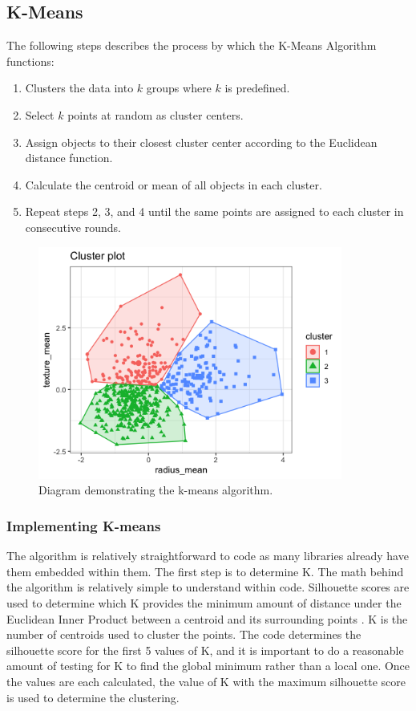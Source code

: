 \documentclass[12pt]{article}
\begin{document}
\subsection{K-Means}
The following steps describes the process by which the K-Means Algorithm functions:
\begin{enumerate}
    \item Clusters the data into $k$ groups where $k$ is predefined.
    \item Select $k$ points at random as cluster centers.
    \item Assign objects to their closest cluster center according to the Euclidean distance function.
    \item Calculate the centroid or mean of all objects in each cluster.
    \item Repeat steps 2, 3, and 4 until the same points are assigned to each cluster in consecutive rounds.
   
\end{enumerate}
 \begin{figure}[H]
    \centering
    \includegraphics[width=10cm]{kmeans.png}
    \caption{Diagram demonstrating the k-means algorithm.}
    \label{fig:k-means}
\end{figure}
\subsubsection{Implementing K-means}
The algorithm is relatively straightforward to code as many libraries already have them embedded within them.
The first step is to determine K.
The math behind the algorithm is relatively simple to understand within code.
Silhouette scores are used to determine which K provides the minimum amount of distance under the Euclidean Inner Product between a centroid and its surrounding points \cite{mora-clustering}.
K is the number of centroids used to cluster the points.
The code determines the silhouette score for the first 5 values of K, and it is important to do a reasonable amount of testing for K to find the global minimum rather than a local one.
Once the values are each calculated, the value of K with the maximum silhouette score is used to determine the clustering.
\vspace{1em}
\end{document}

